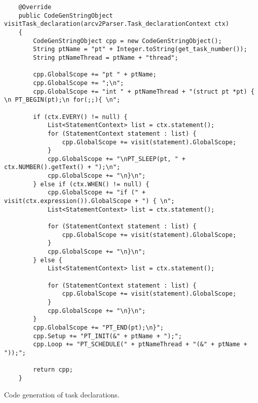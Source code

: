 \begin{listing}[htb!]
    \begin{verbatim}
    @Override
    public CodeGenStringObject visitTask_declaration(arcv2Parser.Task_declarationContext ctx)
    {
        CodeGenStringObject cpp = new CodeGenStringObject();
        String ptName = "pt" + Integer.toString(get_task_number());
        String ptNameThread = ptName + "thread";

        cpp.GlobalScope += "pt " + ptName;
        cpp.GlobalScope += ";\n";
        cpp.GlobalScope += "int " + ptNameThread + "(struct pt *pt) { \n PT_BEGIN(pt);\n for(;;){ \n";

        if (ctx.EVERY() != null) {
            List<StatementContext> list = ctx.statement();
            for (StatementContext statement : list) {
                cpp.GlobalScope += visit(statement).GlobalScope;
            }
            cpp.GlobalScope += "\nPT_SLEEP(pt, " + ctx.NUMBER().getText() + ");\n";
            cpp.GlobalScope += "\n}\n";
        } else if (ctx.WHEN() != null) {
            cpp.GlobalScope += "if (" + visit(ctx.expression()).GlobalScope + ") { \n";
            List<StatementContext> list = ctx.statement();

            for (StatementContext statement : list) {
                cpp.GlobalScope += visit(statement).GlobalScope;
            }
            cpp.GlobalScope += "\n}\n";
        } else {
            List<StatementContext> list = ctx.statement();
            
            for (StatementContext statement : list) {
                cpp.GlobalScope += visit(statement).GlobalScope;
            }
            cpp.GlobalScope += "\n}\n";
        }
        cpp.GlobalScope += "PT_END(pt);\n}";
        cpp.Setup += "PT_INIT(&" + ptName + ");";
        cpp.Loop += "PT_SCHEDULE(" + ptNameThread + "(&" + ptName + "));";

        return cpp;
    }
    \end{verbatim}
    \caption{Code generation of task declarations.}
    \label{lst:codeGenTask}
\end{listing}